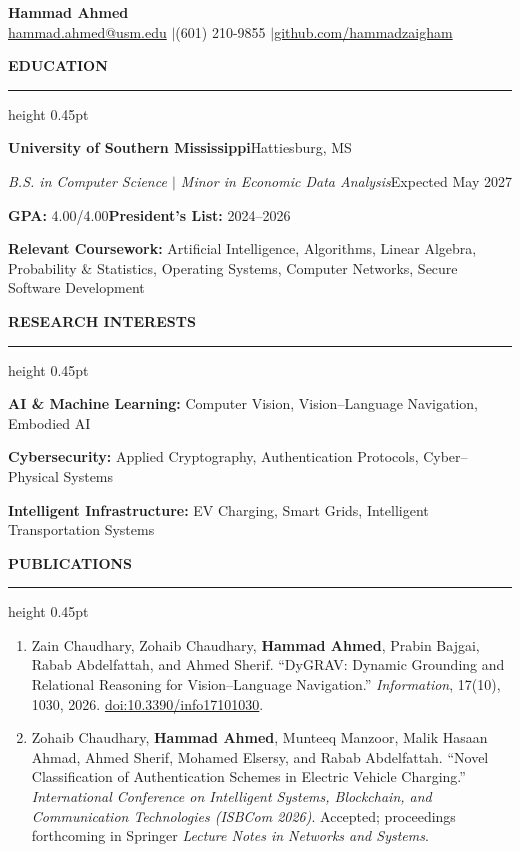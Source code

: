 \documentclass[11pt]{article}
\newcommand{\cvsection}[1]{%
  \Needspace{4\baselineskip}%
  \par\addvspace{8.5pt}%
  \noindent\textbf{\MakeUppercase{#1}}\par\nobreak
  \vspace{2pt}\hrule height 0.45pt\relax\nobreak\vspace{4pt}%
}
\newcommand{\entryheading}[4]{%
  \textbf{#1}\hfill #2\par
  \textit{#3}\hfill #4\par
}
\begin{document}
\begin{center}
  {\LARGE\textbf{Hammad Ahmed}}\\[3pt]
  \href{mailto:hammad.ahmed@usm.edu}{hammad.ahmed@usm.edu}
  \quad$\vert$\quad (601) 210-9855
  \quad$\vert$\quad \href{https://github.com/hammadzaigham}{github.com/hammadzaigham}
\end{center}
\vspace{-5pt}

\cvsection{Education}
\entryheading{University of Southern Mississippi}{Hattiesburg, MS}
  {B.S. in Computer Science $\vert$ Minor in Economic Data Analysis}{Expected May 2027}
\textbf{GPA:} 4.00/4.00\hfill\textbf{President's List:} 2024--2026\par\vspace{2pt}
\textbf{Relevant Coursework:} Artificial Intelligence, Algorithms, Linear Algebra, Probability \& Statistics,
Operating Systems, Computer Networks, Secure Software Development

\cvsection{Research Interests}
\textbf{AI \& Machine Learning:} Computer Vision, Vision--Language Navigation, Embodied AI\par
\textbf{Cybersecurity:} Applied Cryptography, Authentication Protocols, Cyber--Physical Systems\par
\textbf{Intelligent Infrastructure:} EV Charging, Smart Grids, Intelligent Transportation Systems

\cvsection{Publications}
\begin{enumerate}
  \item Zain Chaudhary, Zohaib Chaudhary, \textbf{Hammad Ahmed}, Prabin Bajgai,
  Rabab Abdelfattah, and Ahmed Sherif. ``DyGRAV: Dynamic Grounding and Relational
  Reasoning for Vision--Language Navigation.'' \textit{Information}, 17(10),
  1030, 2026. \href{https://doi.org/10.3390/info17101030}{doi:10.3390/info17101030}.

  \item Zohaib Chaudhary, \textbf{Hammad Ahmed}, Munteeq Manzoor, Malik Hasaan Ahmad,
  Ahmed Sherif, Mohamed Elsersy, and Rabab Abdelfattah. ``Novel Classification
  of Authentication Schemes in Electric Vehicle Charging.''
  \textit{International Conference on Intelligent Systems, Blockchain, and
  Communication Technologies (ISBCom 2026)}. Accepted; proceedings forthcoming
  in Springer \textit{Lecture Notes in Networks and Systems}.
\end{enumerate}
\end{document}
